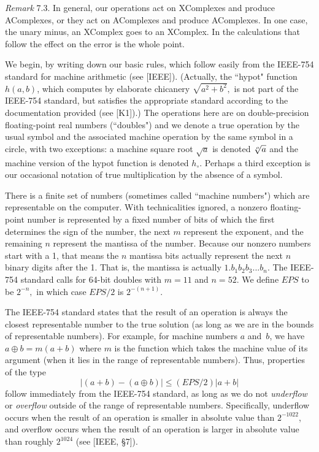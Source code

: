 \enddemo

{\it Remark} 7.3.
In general,  our operations  act on XComplexes and produce AComplexes, or they act on AComplexes and produce
 AComplexes.  In one case, the unary minus, an XComplex goes to an XComplex.  
In the calculations that follow the effect on the error is the whole point.

We begin, by writing down our basic rules, which follow easily from the IEEE-754 standard for machine arithmetic (see [IEEE]).
(Actually,  the ``hypot" function $h(a,b)$, which computes by elaborate chicanery $\sqrt{a^2 + b^2},$ is not part of the IEEE-754 standard, but  satisfies the appropriate standard according to the documentation provided (see [K1]).)  The operations here are on
double-precision floating-point real numbers (``doubles") and we denote a true operation by the usual symbol and the associated machine operation by the same symbol in a circle, with two exceptions: a machine square root $\sqrt a$ is denoted $\root o \of a$ and the machine version of the hypot function is denoted $h_\circ$.  Perhaps a third exception is our occasional notation of true multiplication by the absence of a symbol.  

There is a finite set of numbers (sometimes called ``machine numbers") which are representable on the computer.  With
technicalities ignored,    a nonzero floating-point number is represented by a fixed number of bits of which
the first determines the sign of the number, the next $m$ represent the exponent, and the remaining $n$ represent the
mantissa of the number.  Because our nonzero numbers start with a 1, that means the $n$ mantissa bits actually represent
the next
$n$ binary digits after the 1.  That is, the mantissa is actually $1.b_1b_2b_3...b_{n}.$   The IEEE-754 standard calls for
64-bit doubles with $m = 11$ and $n = 52.$  We define $EPS$ to be $2^{-n},$ in which case $EPS/2$ is $2^{-(n + 1)}.$  

The IEEE-754 standard states that the result of an operation
 is always the closest representable number to the true solution (as long as we are in the bounds of representable
numbers).  For example, for machine numbers $a$ and~$b$, we have $a \oplus b = m(a+b)$ where $m$ is the function which
takes the machine value of its argument (when it lies in the range of representable numbers).  Thus, properties of the type
$$|(a + b) - (a \oplus b)| \leq (EPS/2) |a + b|$$
follow immediately from the IEEE-754 standard, as long as we do not {\it underflow} or {\it overflow} outside of the range of representable numbers. 
Specifically, underflow occurs when the result of an operation is smaller in absolute value than $2^{-1022}$,
 and overflow occurs when the result of an operation is larger in absolute value than roughly $2^{1024}$
 (see [IEEE, \S 7]).

